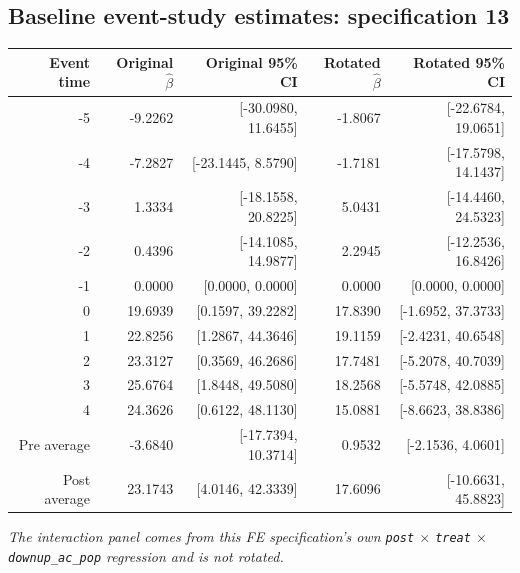 \documentclass[10pt]{article}
\begin{document}
\subsection*{Baseline event-study estimates: specification 13}
\begin{center}
\scriptsize
\begin{tabular}{r rr rr}
\toprule
Event time & Original $\hat\beta$ & Original 95\% CI & Rotated $\hat\beta$ & Rotated 95\% CI \\
\midrule
-5 & -9.2262 & [-30.0980, 11.6455] & -1.8067 & [-22.6784, 19.0651] \\
-4 & -7.2827 & [-23.1445, 8.5790] & -1.7181 & [-17.5798, 14.1437] \\
-3 & 1.3334 & [-18.1558, 20.8225] & 5.0431 & [-14.4460, 24.5323] \\
-2 & 0.4396 & [-14.1085, 14.9877] & 2.2945 & [-12.2536, 16.8426] \\
-1 & 0.0000 & [0.0000, 0.0000] & 0.0000 & [0.0000, 0.0000] \\
0 & 19.6939 & [0.1597, 39.2282] & 17.8390 & [-1.6952, 37.3733] \\
1 & 22.8256 & [1.2867, 44.3646] & 19.1159 & [-2.4231, 40.6548] \\
2 & 23.3127 & [0.3569, 46.2686] & 17.7481 & [-5.2078, 40.7039] \\
3 & 25.6764 & [1.8448, 49.5080] & 18.2568 & [-5.5748, 42.0885] \\
4 & 24.3626 & [0.6122, 48.1130] & 15.0881 & [-8.6623, 38.8386] \\
\midrule
Pre average & -3.6840 & [-17.7394, 10.3714] & 0.9532 & [-2.1536, 4.0601] \\
Post average & 23.1743 & [4.0146, 42.3339] & 17.6096 & [-10.6631, 45.8823] \\
\bottomrule
\end{tabular}
\end{center}
\medskip
\textit{The interaction panel comes from this FE specification's own \texttt{post} $\times$ \texttt{treat} $\times$ \texttt{downup\_ac\_pop} regression and is not rotated.}
\clearpage
\end{document}
